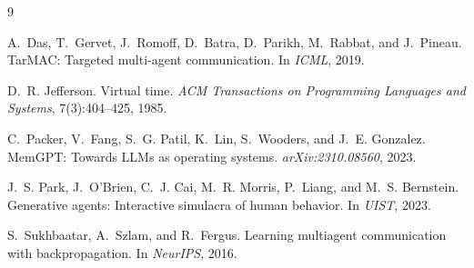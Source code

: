 \documentclass{article}
\begin{document}
\begin{thebibliography}{9}

A.~Das, T.~Gervet, J.~Romoff, D.~Batra, D.~Parikh, M.~Rabbat, and
J.~Pineau.
\newblock TarMAC: Targeted multi-agent communication.
\newblock In \emph{ICML}, 2019.

D.~R. Jefferson.
\newblock Virtual time.
\newblock \emph{ACM Transactions on Programming Languages and Systems},
7(3):404--425, 1985.

C.~Packer, V.~Fang, S.~G. Patil, K.~Lin, S.~Wooders, and J.~E.
Gonzalez.
\newblock MemGPT: Towards LLMs as operating systems.
\newblock \emph{arXiv:2310.08560}, 2023.

J.~S. Park, J.~O'Brien, C.~J. Cai, M.~R. Morris, P.~Liang, and M.~S.
Bernstein.
\newblock Generative agents: Interactive simulacra of human behavior.
\newblock In \emph{UIST}, 2023.

S.~Sukhbaatar, A.~Szlam, and R.~Fergus.
\newblock Learning multiagent communication with backpropagation.
\newblock In \emph{NeurIPS}, 2016.

\end{thebibliography}
\end{document}

